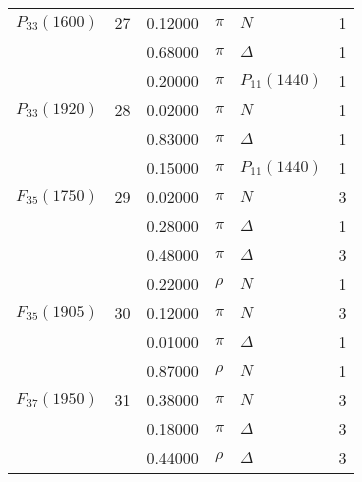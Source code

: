 \documentclass[a4paper,10pt]{article}
\begin{document}
\begin{tabular}[t]{lrllll}
\midrule
$      P_{33}(1600)  $& 27& 0.12000&$ \pi                 $ &$ N                   $& 1\\
$                    $&   & 0.68000&$ \pi                 $ &$ \Delta              $& 1\\
$                    $&   & 0.20000&$ \pi                 $ &$ P_{11}(1440)        $& 1\\
\midrule
$      P_{33}(1920)  $& 28& 0.02000&$ \pi                 $ &$ N                   $& 1\\
$                    $&   & 0.83000&$ \pi                 $ &$ \Delta              $& 1\\
$                    $&   & 0.15000&$ \pi                 $ &$ P_{11}(1440)        $& 1\\
\midrule
$      F_{35}(1750)  $& 29& 0.02000&$ \pi                 $ &$ N                   $& 3\\
$                    $&   & 0.28000&$ \pi                 $ &$ \Delta              $& 1\\
$                    $&   & 0.48000&$ \pi                 $ &$ \Delta              $& 3\\
$                    $&   & 0.22000&$ \rho                $ &$ N                   $& 1\\
\midrule
$      F_{35}(1905)  $& 30& 0.12000&$ \pi                 $ &$ N                   $& 3\\
$                    $&   & 0.01000&$ \pi                 $ &$ \Delta              $& 1\\
$                    $&   & 0.87000&$ \rho                $ &$ N                   $& 1\\
\midrule
$      F_{37}(1950)  $& 31& 0.38000&$ \pi                 $ &$ N                   $& 3\\
$                    $&   & 0.18000&$ \pi                 $ &$ \Delta              $& 3\\
$                    $&   & 0.44000&$ \rho                $ &$ \Delta              $& 3\\
\bottomrule
\end{tabular}
 
\end{document}
